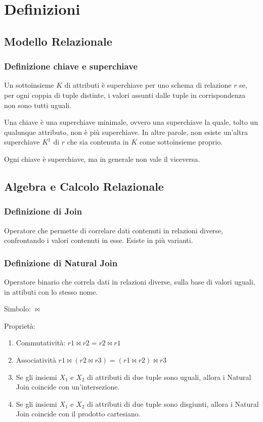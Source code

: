 \section{Definizioni}
\subsection{Modello Relazionale}
\subsubsection{Definizione chiave e superchiave}

Un sottoinsieme $K$ di attributi è superchiave per uno schema di relazione $r$
se, per ogni coppia di tuple distinte, i valori assunti dalle
tuple in corrispondenza non sono tutti uguali.

\noindent
Una chiave è una superchiave minimale, ovvero una superchiave la quale,
tolto un qualunque attributo, non è più superchiave. In altre parole, non
esiste un'altra superchiave $K^1$ di $r$ che sia contenuta in $K$ come sottoinsieme proprio.

\noindent
Ogni chiave è superchiave,
ma in generale non vale il viceversa.

\subsection{Algebra e Calcolo Relazionale}
\subsubsection{Definizione di Join}
Operatore che permette di correlare dati contenuti in relazioni diverse,
confrontando i valori contenuti in esse. Esiste in più varianti.

\subsubsection{Definizione di Natural Join}
Operatore binario che correla dati in relazioni diverse, sulla base di valori
uguali, in attibuti con lo stesso nome.

\noindent
Simbolo: $\bowtie$

\noindent
Proprietà:

\begin{enumerate}
  \item Commutatività: $r1 \bowtie r2 = r2 \bowtie r1$
  \item Associatività $r1 \bowtie (r2 \bowtie r3) = (r1 \bowtie r2) \bowtie r3$
  \item Se gli insiemi $X_1$ e $X_2$ di attributi di due tuple sono uguali, allora i
  Natural Join coincide con un'intersezione.
  \item Se gli insiemi $X_1$ e $X_2$ di attributi di due tuple sono disgiunti, allora i
  Natural Join coincide con il prodotto cartesiano.
\end{enumerate}

